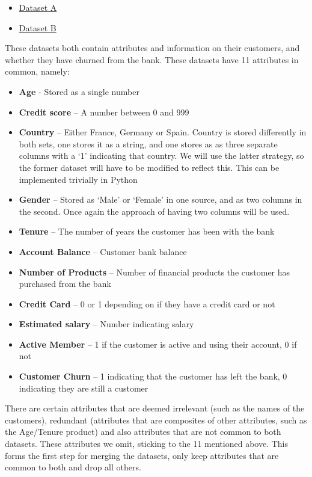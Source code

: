 \documentclass[]{article}
\begin{document}
\begin{itemize}
	\item \href{https://www.kaggle.com/datasets/gauravtopre/bank-customer-churn-dataset}{Dataset A}
	\item \href{https://www.kaggle.com/datasets/willianoliveiragibin/bank-churn-prediction}{Dataset B}
\end{itemize}

These datasets both contain attributes and information on their customers, and whether they have churned from the bank. These datasets have 11 attributes in common, namely:

\begin{itemize}
	\item \textbf{Age} - Stored as a single number
	\item \textbf{Credit score} – A number between 0 and 999
	\item \textbf{Country} – Either France, Germany or Spain. Country is stored differently in both sets, one stores it as a string, and one stores as as three separate columns with a ‘1’ indicating that country. We will use the latter strategy, so the former dataset will have to be modified to reflect this. This can be implemented trivially in Python
	\item \textbf{Gender} – Stored as ‘Male’ or ‘Female’ in one source, and as two columns in the second. Once again the approach of having two columns will be used.
	\item \textbf{Tenure} – The number of years the customer has been with the bank
	\item \textbf{Account Balance} – Customer bank balance
	\item \textbf{Number of Products} – Number of financial products the customer has purchased from the bank
	\item \textbf{Credit Card} – 0 or 1 depending on if they have a credit card or not
	\item \textbf{Estimated salary} – Number indicating salary
	\item \textbf{Active Member} – 1 if the customer is active and using their account, 0 if not
	\item \textbf{Customer Churn} – 1 indicating that the customer has left the bank, 0 indicating they are still a customer
\end{itemize}

There are certain attributes that are deemed irrelevant (such as the names of the customers), redundant (attributes that are composites of other attributes, such as the Age/Tenure product) and also attributes that are not common to both datasets. These attributes we omit, sticking to the 11 mentioned above. This forms the first step for merging the datasets, only keep attributes that are common to both and drop all others.
\end{document}
